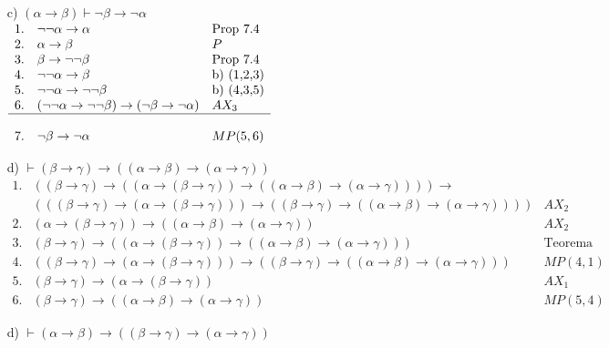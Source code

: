 \documentclass{amsart}
\begin{document}
{\begin{enumerate}
        \item[c)] $(\alpha \to \beta) \vdash \neg \beta \to \neg \alpha$ \\ 
        $
        \begin{array}{lll}
            1. & \neg \neg \alpha \to \alpha & \mbox{Prop 7.4} \\
            2. & \alpha \to \beta & P \\
            3. & \beta \to \neg \neg \beta & \mbox{Prop 7.4} \\
            4. & \neg \neg \alpha \to \beta & \mbox{b) (1,2,3)} \\ 
            5. & \neg \neg \alpha \to \neg \neg \beta & \mbox{\mbox{b) (4,3,5)}} \\
            6. & (\neg \neg \alpha \to \neg \neg \beta) \to (\neg \beta \to \neg \alpha) & AX_3 \\
            \hline \\ 
            7. & \neg \beta \to \neg \alpha & MP(5,6)
        \end{array}
        $
        
        \item[d)] $ \vdash (\beta \to \gamma) \to ((\alpha\to\beta) \to (\alpha\to\gamma)) $ \\
        $
        \begin{array}{lll}
            1. & ( (\beta \to \gamma) \to ( (\alpha \to (\beta \to \gamma)) \to ((\alpha \to \beta) \to (\alpha \to \gamma)) ) ) \to & \\ 
            & ( ( (\beta \to \gamma) \to ( \alpha \to (\beta \to \gamma)) ) \to ( (\beta \to \gamma) \to ((\alpha\to\beta)\to(\alpha\to\gamma )) ) ) & AX_2 \\
            2. & (\alpha \to (\beta \to \gamma)) \to ((\alpha \to \beta) \to (\alpha \to \gamma)) & AX_2 \\
            3. & (\beta \to \gamma) \to ( (\alpha \to (\beta \to \gamma)) \to ((\alpha \to \beta) \to (\alpha \to \gamma)) ) & \mbox{Teorema en clase a 2.} \\ 
            4. & ( (\beta \to \gamma) \to ( \alpha \to (\beta \to \gamma)) ) \to ( (\beta \to \gamma) \to ((\alpha\to\beta)\to(\alpha\to\gamma )) ) & MP(4,1) \\ 
            5. & (\beta \to \gamma) \to ( \alpha \to (\beta \to \gamma)) & AX_1 \\ 
            \hline
            6. & (\beta \to \gamma) \to ((\alpha\to\beta)\to(\alpha\to\gamma )) & MP(5,4)
        \end{array}
        $

        \item[d)] $ \vdash (\alpha \to \beta) \to ((\beta\to\gamma)\to(\alpha\to\gamma)) $ 
    \end{enumerate}
}
\end{document}

